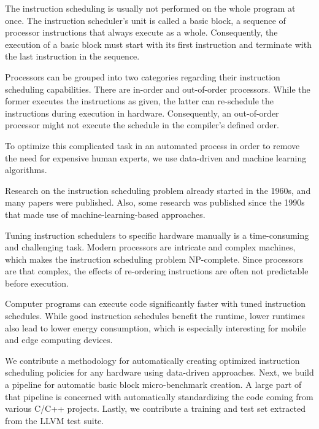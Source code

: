 The instruction scheduling is usually not performed on the whole program at once.
The instruction scheduler's unit is called a basic block, a sequence of processor instructions that always execute as a whole.
Consequently, the execution of a basic block must start with its first instruction and terminate with the last instruction in the sequence.

Processors can be grouped into two categories regarding their instruction scheduling capabilities.
There are in-order and out-of-order processors.
While the former executes the instructions as given, the latter can re-schedule the instructions during execution in hardware.
Consequently, an out-of-order processor might not execute the schedule in the compiler's defined order.

To optimize this complicated task in an automated process in order to remove the need for expensive human experts, we use data-driven and machine learning algorithms.

Research on the instruction scheduling problem already started in the 1960s, and many papers were published.
Also, some research was published since the 1990s that made use of machine-learning-based approaches.

Tuning instruction schedulers to specific hardware manually is a time-consuming and challenging task.
Modern processors are intricate and complex machines, which makes the instruction scheduling problem NP-complete.
Since processors are that complex, the effects of re-ordering instructions are often not predictable before execution.

Computer programs can execute code significantly faster with tuned instruction schedules. 
While good instruction schedules benefit the runtime, lower runtimes also lead to lower energy consumption, which is especially interesting for mobile and edge computing devices.

We contribute a methodology for automatically creating optimized instruction scheduling policies for any hardware using data-driven approaches.
Next, we build a pipeline for automatic basic block micro-benchmark creation.
A large part of that pipeline is concerned with automatically standardizing the code coming from various C/C++ projects.
Lastly, we contribute a training and test set extracted from the LLVM test suite.

